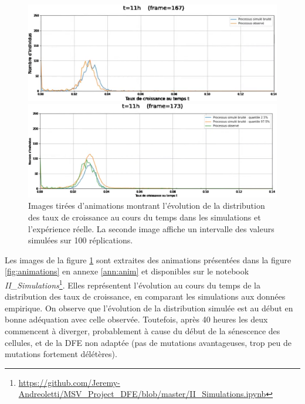 \documentclass[12pt]{article}
\begin{document}
\begin{figure}[h]
  \begin{center}
    \vspace{3mm}
    \includegraphics[scale=0.25]{img/GrowthRates_noisySimulations_VS_observations.png}

    \vspace{5mm}

    \includegraphics[scale=0.25]{img/GrowthRates_noisySimulationsInterval_VS_observations.png}
  \end{center} 
  \caption{\label{fig:ss_animations}Images tirées d'animations montrant l'évolution de la distribution des taux de croissance au cours du temps dans les simulations et l'expérience réelle. La seconde image affiche un intervalle des valeurs simulées sur 100 réplications.}
\end{figure}

Les images de la figure \ref{fig:ss_animations} sont extraites des animations présentées dans la figure \ref{fig:animations} en annexe \ref{ann:anim} et disponibles sur le notebook \emph{II\_Simulations}\footnote{\url{https://github.com/Jeremy-Andreoletti/MSV_Project_DFE/blob/master/II_Simulations.ipynb}}. Elles représentent l'évolution au cours du temps de la distribution des taux de croissance, en comparant les simulations aux données empirique. On observe que l'évolution de la distribution simulée est au début en bonne adéquation avec celle observée. Toutefois, après 40 heures les deux commencent à diverger, probablement à cause du début de la sénescence des cellules, et de la DFE non adaptée (pas de mutations avantageuses, trop peu de mutations fortement délétères).
\end{document}
